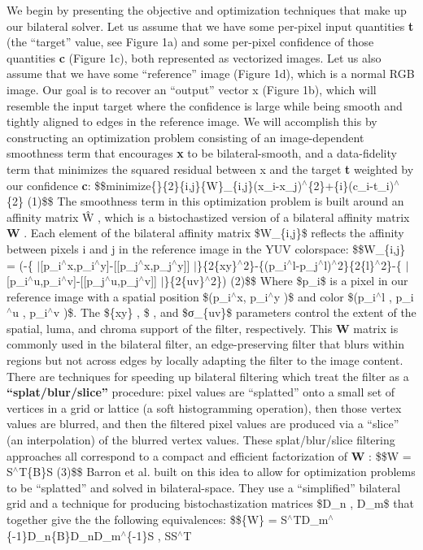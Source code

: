 We begin by presenting the objective and optimization techniques that make up our bilateral solver. Let us assume that we have some per-\/pixel input quantities {\bfseries t} (the “target” value, see Figure 1a) and some per-\/pixel confidence of those quantities {\bfseries c} (Figure 1c), both represented as vectorized images. Let us also assume that we have some “reference” image (Figure 1d), which is a normal R\+GB image. Our goal is to recover an “output” vector x (Figure 1b), which will resemble the input target where the confidence is large while being smooth and tightly aligned to edges in the reference image. We will accomplish this by constructing an optimization problem consisting of an image-\/dependent smoothness term that encourages {\bfseries x} to be bilateral-\/smooth, and a data-\/fidelity term that minimizes the squared residual between x and the target {\bfseries t} weighted by our confidence {\bfseries c}\+: \$\$minimize\{\}\{2\}\{i,j\}\{W\}\+\_\+\{i,j\}(x\+\_\+i-\/x\+\_\+j)$^\wedge$\{2\}+\{i\}(c\+\_\+i-\/t\+\_\+i)$^\wedge$\{2\}  (1)\$\$ The smoothness term in this optimization problem is built around an affinity matrix Ŵ , which is a bistochastized version of a bilateral affinity matrix {\bfseries W} . Each element of the bilateral affinity matrix \$\+W\+\_\+\{i,j\}\$ reflects the affinity between pixels i and j in the reference image in the Y\+UV colorspace\+: \$\$\+W\+\_\+\{i,j\} = (-\/\{ $|$\mbox{[}p\+\_\+i$^\wedge$x,p\+\_\+i$^\wedge$y\mbox{]}-\/\mbox{[}\mbox{[}p\+\_\+j$^\wedge$x,p\+\_\+j$^\wedge$y\mbox{]}\mbox{]} $|$\}\{2\{xy\}$^\wedge$2\}-\/\{(p\+\_\+i$^\wedge$l-\/p\+\_\+j$^\wedge$l)$^\wedge$2\}\{2\{l\}$^\wedge$2\}-\/\{ $|$\mbox{[}p\+\_\+i$^\wedge$u,p\+\_\+i$^\wedge$v\mbox{]}-\/\mbox{[}\mbox{[}p\+\_\+j$^\wedge$u,p\+\_\+j$^\wedge$v\mbox{]}\mbox{]} $|$\}\{2\{uv\}$^\wedge$2\}) (2)\$\$ Where \$p\+\_\+i\$ is a pixel in our reference image with a spatial position \$(p\+\_\+i$^\wedge$x, p\+\_\+i$^\wedge$y )\$ and color \$(p\+\_\+i$^\wedge$l , p\+\_\+i$^\wedge$u , p\+\_\+i$^\wedge$v )\$. The \$\{xy\} , \$ , and \$σ\+\_\+\{uv\}\$ parameters control the extent of the spatial, luma, and chroma support of the filter, respectively. This {\bfseries W} matrix is commonly used in the bilateral filter, an edge-\/preserving filter that blurs within regions but not across edges by locally adapting the filter to the image content. There are techniques for speeding up bilateral filtering which treat the filter as a {\bfseries “splat/blur/slice”} procedure\+: pixel values are “splatted” onto a small set of vertices in a grid or lattice (a soft histogramming operation), then those vertex values are blurred, and then the filtered pixel values are produced via a “slice” (an interpolation) of the blurred vertex values. These splat/blur/slice filtering approaches all correspond to a compact and efficient factorization of {\bfseries W} \+: \$\$W = S$^\wedge$T\{B\}S (3)\$\$ Barron et al. built on this idea to allow for optimization problems to be “splatted” and solved in bilateral-\/space. They use a “simplified” bilateral grid and a technique for producing bistochastization matrices \$\+D\+\_\+n , D\+\_\+m\$ that together give the the following equivalences\+: \$\$\{W\} = S$^\wedge$\+T\+D\+\_\+m$^\wedge$\{-\/1\}D\+\_\+n\{B\}D\+\_\+n\+D\+\_\+m$^\wedge$\{-\/1\}S , S\+S$^\wedge$T 